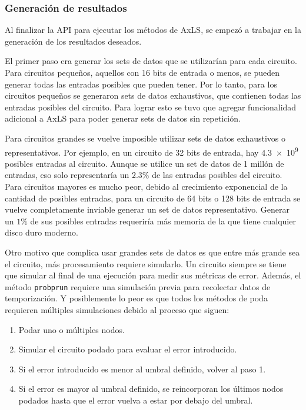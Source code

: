 \subsubsection{Generación de resultados}

Al finalizar la API para ejecutar los métodos de AxLS, se empezó a trabajar en
la generación de los resultados deseados.

El primer paso era generar los sets de datos que se utilizarían para cada
circuito. Para circuitos pequeños, aquellos con 16 bits de entrada o menos, se
pueden generar todas las entradas posibles que pueden tener.
Por lo tanto, para los circuitos pequeños se generaron sets de datos
exhaustivos, que contienen todas las entradas posibles del circuito.
Para lograr esto se tuvo que agregar funcionalidad adicional a AxLS para poder
generar sets de datos sin repetición.

Para circuitos grandes se vuelve imposible utilizar sets de datos exhaustivos o
representativos. Por ejemplo, en un circuito de 32 bits de entrada, hay \num{4.3e9}
posibles entradas al circuito. Aunque se utilice un set de datos de 1 millón de
entradas, eso solo representaría un $2.3\%$ de las entradas posibles del
circuito. Para circuitos mayores es mucho peor, debido al crecimiento
exponencial de la cantidad de posibles entradas, para un circuito de 64 bits o
128 bits de entrada se vuelve completamente inviable generar un set de datos
representativo. Generar un $1\%$ de sus posibles entradas requeriría más memoria
de la que tiene cualquier disco duro moderno.

Otro motivo que complica usar grandes sets de datos es que entre más grande sea
el circuito, más procesamiento requiere simularlo. Un circuito siempre se tiene
que simular al final de una ejecución para medir sus métricas de error. Además,
el método \texttt{probprun} requiere una simulación previa para recolectar
datos de temporización. Y posiblemente lo peor es que todos los métodos de poda
requieren múltiples simulaciones debido al proceso que siguen:

\begin{enumerate}
  \item Podar uno o múltiples nodos.
  \item Simular el circuito podado para evaluar el error introducido.
  \item Si el error introducido es menor al umbral definido, volver al paso 1.
  \item Si el error es mayor al umbral definido, se reincorporan los últimos
    nodos podados hasta que el error vuelva a estar por debajo del umbral.
\end{enumerate}

